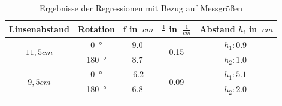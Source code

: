 \begin{table}[h!]
    \begin{center}
        \caption{Ergebnisse der Regressionen mit Bezug auf Messgrößen}
        \begin{tabular}{ccccc}
            \hline
            Linsenabstand           & Rotation          & f in $\SI{}{cm}$  & $\frac{1}{}$ in $\SI{}{\frac{1}{cm}}$ & Abstand $h_i$ in $\SI{}{cm}$\\
            \hline
            
            \multirow{2}{*}{$11,5cm$}  & \SI{0}{\degree}   & $\SI{9,0}{}$      & \multirow{2}{*}{\SI{0,15}{}}  & $h_1: \SI{0,9}{}$ \\
                                    & \SI{180}{\degree} & $\SI{8,7}{}$      &                               & $h_2: \SI{1,0}{}$ \\
            \hline
            \multirow{2}{*}{$9,5cm$}  & \SI{0}{\degree}   & $\SI{6,2}$     & \multirow{2}{*}{\SI{0,09}{}}  & $h_1: \SI{5,1}{}$ \\
                                    & \SI{180}{\degree} & $\SI{6,8}{}$     &                               & $h_2: \SI{2,0}{}$ \\
            \hline
            \label{tab:abbe-Regression-Werte}
        \end{tabular}
    \end{center}
\end{table}